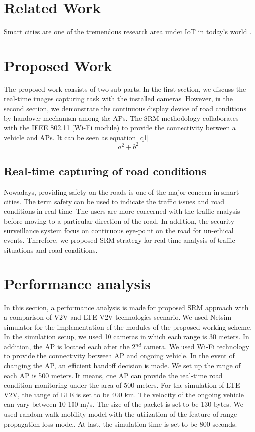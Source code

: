 \documentclass[journal,transmag]{IEEEtran}
\begin{document}
    
    
    \section{Related Work}
    Smart cities are one of the tremendous research area under IoT in today’s world \cite{Gupta}. 
    
    \section{Proposed Work}
    The proposed work consists of two sub-parts. In the first section, we discuss the real-time images capturing task with the installed cameras. However, in the second section, we demonstrate the continuous display device of road conditions by handover mechanism among the APs. The SRM methodology collaborates with the IEEE 802.11 (Wi-Fi module) to provide the connectivity between a vehicle and APs. It can be seen as equation \ref{q1}
    \begin{equation}
    a^2+b^2
    \label{q1}
    \end{equation}
    
    \subsection {Real-time capturing of road conditions}
    
    Nowadays, providing safety on the roads is one of the major concern in smart cities. The term safety can be used to indicate the traffic issues and road conditions in real-time. The users are more concerned with the traffic analysis before moving to a particular direction of the road. In addition, the security surveillance system focus on continuous eye-point on the road for un-ethical events. Therefore, we proposed SRM strategy for real-time analysis of traffic situations and road conditions.
    \section{Performance analysis}
    In this section, a performance analysis is made for proposed SRM approach with a comparison of V2V and LTE-V2V technologies scenario. We used Netsim simulator for the implementation of the modules of the proposed working scheme. In the simulation setup, we used 10 cameras in which each range is 30 meters. In addition, the AP is located each after the 2$^{nd}$ camera. We used Wi-Fi technology to provide the connectivity between AP and ongoing vehicle. In the event of changing the AP, an efficient handoff decision is made. We set up the range of each AP is 500 meters. It means, one AP can provide the real-time road condition monitoring under the area of 500 meters. For the simulation of LTE-V2V, the range of LTE is set to be 400 km. The velocity of the ongoing vehicle can vary between 10-100 m/s. The size of the packet is set to be 130 bytes. We used random walk mobility model with the utilization of the feature of range propagation loss model. At last, the simulation time is set to be 800 seconds.
    
\end{document}
